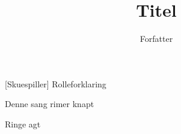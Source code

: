 \documentclass[a4paper,11pt]{article}
\title{Titel}
\author{Forfatter}
\begin{document}
\maketitle

\begin{roles}  
[Skuespiller] Rolleforklaring
\end{roles}

\begin{song}
   Denne sang rimer knapt

   Ringe agt

\end{song}
\end{document}
